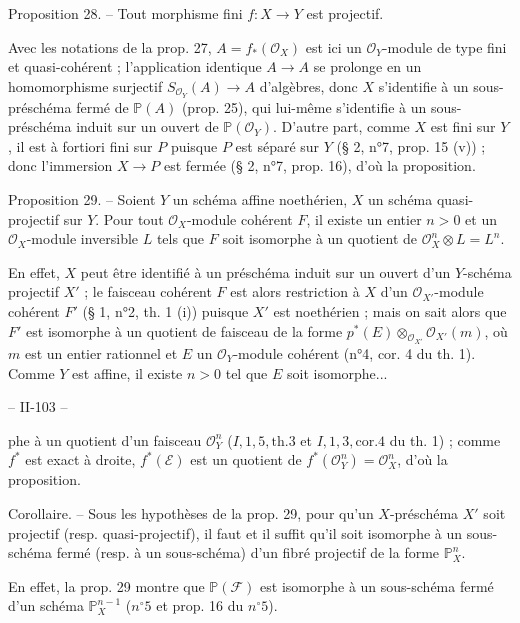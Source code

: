 \medskip

Proposition 28. -- Tout morphisme fini $f: X \to Y$ est projectif.

Avec les notations de la prop. 27, $A = f_*(\mathcal{O}_X)$ est ici un $\mathcal{O}_Y$-module de type fini et quasi-cohérent ; l'application identique $A \to A$ se prolonge en un homomorphisme surjectif $S_{\mathcal{O}_Y}(A) \to A$ d'algèbres, donc $X$ s'identifie à un sous-préschéma fermé de $\mathbb{P}(A)$ (prop. 25), qui lui-même s'identifie à un sous-préschéma induit sur un ouvert de $\mathbb{P}(\mathcal{O}_Y)$. D'autre part, comme $X$ est fini sur $Y$, il est à fortiori fini sur $P$ puisque $P$ est séparé sur $Y$ (§ 2, n°7, prop. 15 (v)) ; donc l'immersion $X \to P$ est fermée (§ 2, n°7, prop. 16), d'où la proposition.

\medskip

Proposition 29. -- Soient $Y$ un schéma affine noethérien, $X$ un schéma quasi-projectif sur $Y$. Pour tout $\mathcal{O}_X$-module cohérent $F$, il existe un entier $n > 0$ et un $\mathcal{O}_X$-module inversible $L$ tels que $F$ soit isomorphe à un quotient de $\mathcal{O}_X^n \otimes L = L^n$.

En effet, $X$ peut être identifié à un préschéma induit sur un ouvert d'un $Y$-schéma projectif $X'$ ; le faisceau cohérent $F$ est alors restriction à $X$ d'un $\mathcal{O}_{X'}$-module cohérent $F'$ (§ 1, n°2, th. 1 (i)) puisque $X'$ est noethérien ; mais on sait alors que $F'$ est isomorphe à un quotient de faisceau de la forme $p^* (E) \otimes_{\mathcal{O}_{X'}} \mathcal{O}_{X'}(m)$, où $m$ est un entier rationnel et $E$ un $\mathcal{O}_Y$-module cohérent (n°4, cor. 4 du th. 1). Comme $Y$ est affine, il existe $n > 0$ tel que $E$ soit isomorphe...

\newpage


-- II-103 --

phe à un quotient d'un faisceau $\mathcal{O}_Y^n$ ($I, 1, 5, \text{th.} 3$ et $I, 1, 3, \text{cor.} 4$ du th. 1) ; comme $f^*$ est exact à droite, $f^*(\mathcal{E})$ est un quotient de $f^*(\mathcal{O}_Y^n) = \mathcal{O}_X^n$, d'où la proposition.

Corollaire. -- Sous les hypothèses de la prop. 29, pour qu'un $X$-préschéma $X'$ soit projectif (resp. quasi-projectif), il faut et il suffit qu'il soit isomorphe à un sous-schéma fermé (resp. à un sous-schéma) d'un fibré projectif de la forme $\mathbb{P}_X^n$.

En effet, la prop. 29 montre que $\mathbb{P}(\mathcal{F})$ est isomorphe à un sous-schéma fermé d'un schéma $\mathbb{P}_X^{n-1}$ ($n^\circ 5$ et prop. 16 du $n^\circ 5$).

